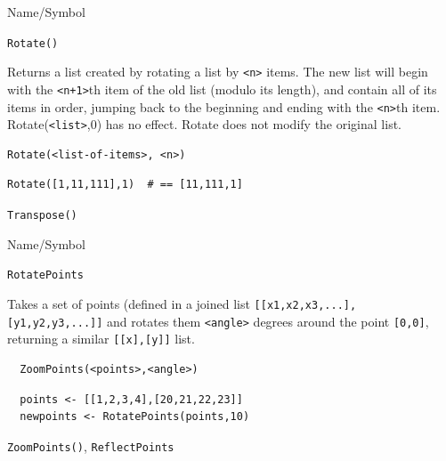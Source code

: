 \begin{desc}{Name/Symbol}
\item[Name/Symbol]	\verb+Rotate()+

\item[Description] 	Returns a list created by rotating a list by \verb!<n>! items.  
		The new list will begin with the \verb!<n+1>!th item of the old 
		list (modulo its length), and contain all of its items in 
		order, jumping back to the beginning and ending with the \verb!<n>!th
		item. Rotate(\verb!<list>!,0) has no effect.  Rotate does not modify 
		the original list.

\item[Usage]
\begin{verbatim}
Rotate(<list-of-items>, <n>)
\end{verbatim}

\item[Example]     	
\begin{verbatim}
Rotate([1,11,111],1)  # == [11,111,1]
\end{verbatim}

\item[See Also]    	\verb+Transpose()+
\end{desc}


\begin{desc}{Name/Symbol}
\item[Name/Symbol]	\verb+RotatePoints+

\item[Description]  Takes a set of points (defined in a joined list 
\verb+[[x1,x2,x3,...],+ \verb+[y1,y2,y3,...]]+ and rotates them \verb+<angle>+ degrees
around the point \verb+[0,0]+,  returning a similar \verb+[[x],[y]]+ list.

\item[Usage]
\begin{verbatim}
  ZoomPoints(<points>,<angle>)
\end{verbatim}

\item[Example] 
\begin{verbatim}
  points <- [[1,2,3,4],[20,21,22,23]]
  newpoints <- RotatePoints(points,10)
\end{verbatim}

\item[See Also] \verb+ZoomPoints()+, \verb+ReflectPoints+
\end{desc}


